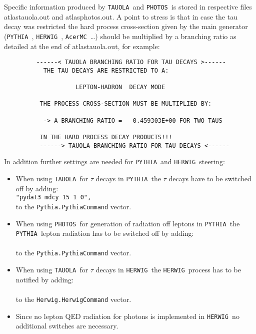 \documentclass[a4paper,12pt]{article}
\newcommand{\acermc}{{\tt AcerMC }}
\newcommand{\pythia}{{\tt PYTHIA }}
\newcommand{\herwig}{{\tt HERWIG }}
\newcommand{\tauola}{{\tt TAUOLA }}
\newcommand{\photos}{{\tt PHOTOS }}
\begin{document}
Specific information produced by \tauola and \photos is stored in respective
files {\sf atlastauola.out} and {\sf atlasphotos.out}. A point to stress is that
in case the tau decay was restricted the hard process cross-section given by the
main generator (\pythia, \herwig, \acermc \ldots) should be multiplied by a
branching ratio as detailed at the end of {\sf atlastauola.out}, for example:
\begin{verbatim}
         ------< TAUOLA BRANCHING RATIO FOR TAU DECAYS >------
           THE TAU DECAYS ARE RESTRICTED TO A:
 
                    LEPTON-HADRON  DECAY MODE

          THE PROCESS CROSS-SECTION MUST BE MULTIPLIED BY:

           -> A BRANCHING RATIO =   0.459303E+00 FOR TWO TAUS
 
          IN THE HARD PROCESS DECAY PRODUCTS!!!
          ------> TAUOLA BRANCHING RATIO FOR TAU DECAYS <------
\end{verbatim}

In addition further settings are needed for \pythia and \herwig steering:
\begin{itemize}
\item  When using \tauola for $\tau$ decays in \pythia the $\tau$ decays have to be
switched off by adding:\\[3pt]
\hspace*{2cm} {\tt "pydat3 mdcy 15 1 0",}\\[3pt]
to the {\tt Pythia.PythiaCommand} vector. 
\item  When using \photos for generation of radiation off leptons in \pythia the
\pythia lepton radiation has to be switched off by adding:\\[3pt]
\hspace*{2cm}{\tt "pydat1 parj 90  20000.",}\\[3pt]
to the {\tt Pythia.PythiaCommand} vector. 
\item   When using \tauola for $\tau$ decays in \herwig the \herwig process has to be
notified by adding:\\[3pt]
\hspace*{2cm}{\tt "taudec TAUOLA",}\\[3pt]
to the {\tt Herwig.HerwigCommand} vector.
\item Since no lepton QED radiation for photons is implemented in \herwig no
additional switches are necessary.
\end{itemize}
\end{document}
